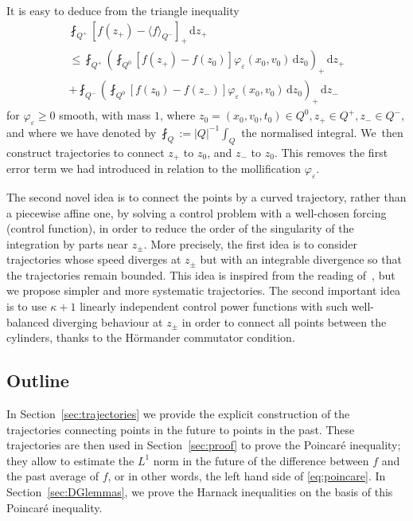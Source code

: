 \documentclass[JEP,XML,SOM,Unicode,NoFloatCountersInSection,published]{cedram}
\theoremstyle{definition}
\newcommand{\dd}{{\, \mathrm d}}
\let\var\varepsilon
\begin{document}
It is easy to deduce from the triangle inequality\vspace*{-5pt}
\begin{multline}\label{eq:split-Q0}
\fint_{Q^+} \left[ f(z_+) - \langle f \rangle_{Q^-} \right]_+ \dd z_+\\[-5pt]
\le
\fint_{Q^+} \left(\fint_{Q^0} \left[ f(z_+) -
f(z_0) \right] \varphi_\var(x_0, v_0)\dd z_0 \right)_+ \dd z_+ \\[-5pt]
+ \fint_{Q^-} \left(\fint_{Q^0} \left[ f(z_0) -
f(z_-) \right]\varphi_\var(x_0, v_0) \dd z_0 \right)_+ \dd z_-
\end{multline}
for $\varphi_\var \ge 0$ smooth, with mass $1$, where
$z_0=(x_0,v_0,t_0) \in Q^0, z_+ \in Q^+, z_- \in Q^-$, and where
we have denoted by $\fint_{Q} := |Q|^{-1} \int_Q$ the normalised
integral. We~then construct trajectories to connect $z_+$ to
$z_0$, and $z_-$ to $z_0$. This removes the first error term we
had introduced in relation to the mollification $\varphi_\var$.

The second novel idea is to connect the points by a curved
trajectory, rather than a piecewise affine one, by solving a
control problem with a well-chosen forcing (\ie control
function), in order to reduce the order of the singularity of the
integration by parts near $z_{\pm}$. More precisely, the first
idea is to consider trajectories whose speed diverges at
$z_{\pm}$ but with an integrable divergence so that the
trajectories remain bounded. This idea is inspired from the
reading of~\cite{niebel2022kinetic}, but we propose simpler and
more systematic trajectories. The second important idea is to use
$\kappa+1$ linearly independent control power functions with such
well-balanced diverging behaviour at $z_{\pm}$ in order to
connect all points between the cylinders, thanks to the Hörmander
commutator condition.

\subsection{Outline}

In Section~\ref{sec:trajectories} we provide the explicit construction
of the trajectories connecting points in the future to points in
the past. These trajectories are then used in
Section~\ref{sec:proof} to prove the Poincaré inequality; they
allow to estimate the $L^1$ norm in the future of the difference
between $f$ and the past average of $f$, or in other words, the
left hand side of \eqref{eq:poincare}. In Section~\ref{sec:DGlemmas}, we
prove the Harnack inequalities on the basis of this Poincaré
inequality.
\end{document}

